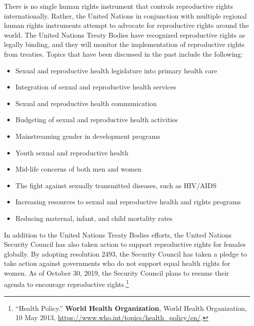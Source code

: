 \documentclass[10pt, letterpaper]{article}
\begin{document}
There is no single human rights instrument that controls reproductive
rights internationally. Rather, the United Nations in conjunction with
multiple regional human rights instruments attempt to advocate for
reproductive rights around the world. The United Nations Treaty Bodies
have recognized reproductive rights as legally binding, and they will
monitor the implementation of reproductive rights from treaties. Topics
that have been discussed in the past include the following: \\
\begin{itemize}
\item
  
  Sexual and reproductive health legislature into primary health care
  
\item
  
  Integration of sexual and reproductive health services
  
\item
  
  Sexual and reproductive health communication
  
\item
  
  Budgeting of sexual and reproductive health activities
  
\item
  
  Mainstreaming gender in development programs
  
\item
  
  Youth sexual and reproductive health
  
\item
  
  Mid-life concerns of both men and women
  
\item
  
  The fight against sexually transmitted diseases, such as HIV/AIDS
  
\item
  
  Increasing resources to sexual and reproductive health and rights
  programs
  
\item
  
  Reducing maternal, infant, and child mortality rates
  
\end{itemize}

In addition to the United Nations Treaty Bodies efforts, the United
Nations Security Council has also taken action to support reproductive
rights for females globally. By adopting resolution 2493, the Security
Council has taken a pledge to take action against governments who do not
support equal health rights for women. As of October 30, 2019, the
Security Council plans to resume their agenda to encourage reproductive
rights.\footnote{``Health Policy.'' \textbf{World Health Organization},
  World Health Organization, 10 May 2013,
  \url{https://www.who.int/topics/health_policy/en/}.} \\
\end{document}
